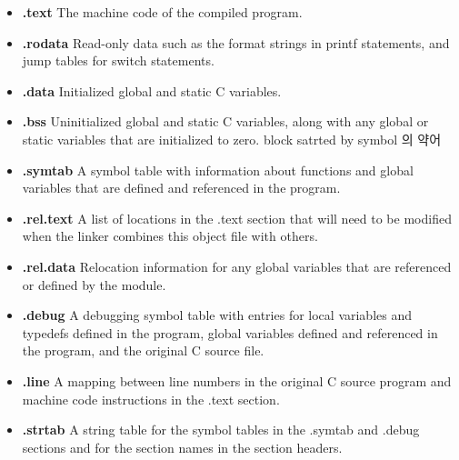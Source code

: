 \documentclass[10pt]{beamer}
\begin{document}
\begin{frame}{}
    \begin{itemize}
        \item \textbf{.text} The machine code of the compiled program.
        
        \item \textbf{.rodata} Read-only data such as the format strings in printf statements, and jump tables for switch statements.
        
        \item  \textbf{.data} Initialized global and static C variables. 
        
        \item \textbf{.bss} Uninitialized global and static C variables, along with any global or static variables that are initialized to zero. block satrted by symbol 의 약어
        
        \item \textbf{.symtab} A symbol table with information about functions and global variables that are defined and referenced in the program. 
    
        \item \textbf{.rel.text} A list of locations in the .text section that will need to be modified when the linker combines this object file with others. 
        
        \item \textbf{.rel.data} Relocation information for any global variables that are referenced or defined by the module.
        
        \item \textbf{.debug} A debugging symbol table with entries for local variables and typedefs defined in the program, global variables defined and referenced in the program, and the original C source file.
        
        \item \textbf{.line} A mapping between line numbers in the original C source program and machine code instructions in the .text section.
        
        \item \textbf{.strtab} A string table for the symbol tables in the .symtab and .debug sections and for the section names in the section headers.
        
    \end{itemize}
\end{frame}    
\end{document}
